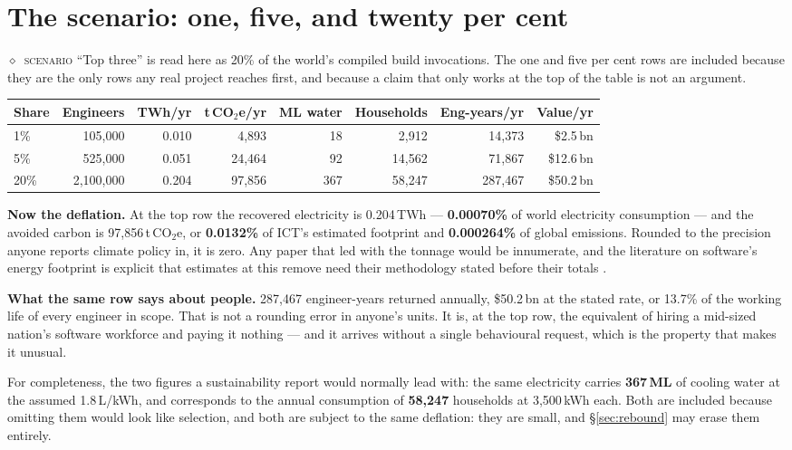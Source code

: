 \documentclass[11pt,a4paper]{article}
\providecommand{\textcite}[1]{\cite{#1}}
\newcommand{\scen}[1]{\textcolor{sigilamber}{\textbf{#1}}}
\newcommand{\stC}{\textcolor{sigilred}{$\diamond$}~{\scriptsize\textsc{scenario}}}
\begin{document}
\section{The scenario: one, five, and twenty per cent}\label{sec:scenario}


\stC{} ``Top three'' is read here as 20\% of the world's compiled build invocations. The one and five per cent rows are included because they are the only rows any real project reaches first, and because a claim that only works at the top of the table is not an argument.

\begin{center}\footnotesize{}\begin{tabular}{lrrrrrrr}\toprule
Share & Engineers & TWh/yr & t\,CO$_2$e/yr & ML water & Households & Eng-years/yr & Value/yr \\\midrule
1\% & 105{,}000 & 0.010 & 4{,}893 & 18 & 2{,}912 & 14{,}373 & \$2.5\,bn \\
5\% & 525{,}000 & 0.051 & 24{,}464 & 92 & 14{,}562 & 71{,}867 & \$12.6\,bn \\
20\% & 2{,}100{,}000 & 0.204 & 97{,}856 & 367 & 58{,}247 & 287{,}467 & \$50.2\,bn \\
\bottomrule\end{tabular}\end{center}


\textbf{Now the deflation.} At the top row the recovered electricity is 0.204\,TWh --- \scen{0.00070\%} of world electricity consumption --- and the avoided carbon is 97{,}856\,t\,CO$_2$e, or \scen{0.0132\%} of ICT's estimated footprint and \scen{0.000264\%} of global emissions. Rounded to the precision anyone reports climate policy in, it is zero. Any paper that led with the tonnage would be innumerate, and the literature on software's energy footprint is explicit that estimates at this remove need their methodology stated before their totals \textcite{arxiv2506_09683,arxiv2407_11611}.

\textbf{What the same row says about people.} 287{,}467 engineer-years returned annually, \$50.2\,bn at the stated rate, or 13.7\% of the working life of every engineer in scope. That is not a rounding error in anyone's units. It is, at the top row, the equivalent of hiring a mid-sized nation's software workforce and paying it nothing --- and it arrives without a single behavioural request, which is the property that makes it unusual.


For completeness, the two figures a sustainability report would normally lead with: the same electricity carries \scen{367\,ML} of cooling water at the assumed 1.8\,L/kWh, and corresponds to the annual consumption of \scen{58{,}247} households at 3{,}500\,kWh each. Both are included because omitting them would look like selection, and both are subject to the same deflation: they are small, and \S\ref{sec:rebound} may erase them entirely.
\end{document}
